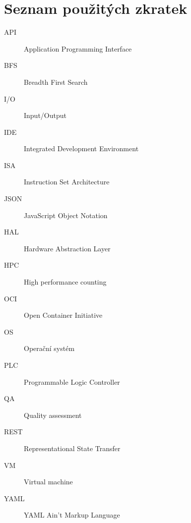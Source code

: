 \chapter{Seznam použitých zkratek}
\begin{description}
	\item[API] Application Programming Interface
	\item[BFS] Breadth First Search 
	\item[I/O] Input/Output
	\item[IDE] Integrated Development Environment 
	\item[ISA] Instruction Set Architecture 
	\item[JSON] JavaScript Object Notation
	\item[HAL] Hardware Abstraction Layer
	\item[HPC] High performance counting
	\item[OCI] Open Container Initiative
	\item[OS] Operační systém 
	\item[PLC] Programmable Logic Controller
	\item[QA] Quality assessment 
	\item[REST] Representational State Transfer
	\item[VM] Virtual machine
	\item[YAML] YAML Ain't Markup Language
\end{description}
